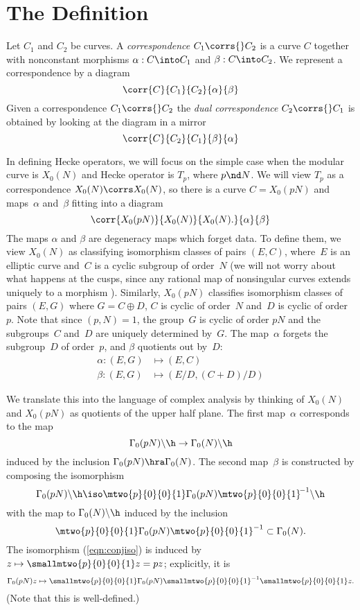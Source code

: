 \documentclass{report}
\begin{document}
\section{The Definition}\label{sec:defn_hecke_corr}

\begin{definition}[Correspondence]
Let $C_1$ and $C_2$ be curves. A {\em correspondence}
$C_1\corrs{}C_2$ is a curve $C$ together with nonconstant morphisms
$\alpha:C\into C_1$ and $\beta:C\into C_2$.  We represent a
correspondence by a diagram
\[
  \corr{C}{C_1}{C_2}{\alpha}{\beta}
\]
Given a correspondence $C_1\corrs{}C_2$ the {\em dual
correspondence} $C_2\corrs{}C_1$ is obtained by looking at the
diagram in a mirror
\[
  \corr{C}{C_2}{C_1}{\beta}{\alpha}
\]
\end{definition}

In defining Hecke operators, we will focus on the simple case when
the modular curve is $X_0(N)$ and Hecke operator is $T_p$, where
$p\nd N$.  We will view $T_p$ as a correspondence $X_0(N)\corrs
X_0(N)$, so there is a curve $C=X_0(pN)$ and maps~$\alpha$
and~$\beta$ fitting into a diagram
\[
  \corr{X_0(pN)}{X_0(N)}{X_0(N).}{\alpha}{\beta}
\]
The maps $\alpha$ and $\beta$ are degeneracy maps which forget
data. To define them, we view $X_0(N)$ as classifying isomorphism
classes of pairs $(E,C)$, where~$E$ is an elliptic curve and~$C$
is a cyclic subgroup of order~$N$ (we will not worry about what
happens at the cusps, since any rational map of nonsingular curves
extends uniquely to a morphism \cite[Ch.~I, Prop.~6.8]{hartshorne}). Similarly, $X_0(pN)$ classifies
isomorphism classes of pairs $(E,G)$ where $G=C\oplus{}D$, $C$ is
cyclic of order~$N$ and~$D$ is cyclic of order~$p$. Note that
since $(p,N)=1$, the group~$G$ is cyclic of order $pN$ and the
subgroups~$C$ and~$D$ are uniquely determined by~$G$. The
map~$\alpha$ forgets the subgroup~$D$ of order~$p$, and $\beta$
quotients out by~$D$:
\begin{align}\label{eqn:alphabeta}
  \alpha:(E,G)&\mapsto(E,C)\\
  \beta:(E,G)&\mapsto(E/D,(C+D)/D)
\end{align}

We translate this into the language of complex analysis by
thinking of $X_0(N)$ and $X_0(pN)$ as quotients of the upper half
plane. The first map~$\alpha$ corresponds to the map
\[
   \Gamma_0(pN)\backslash\h \to \Gamma_0(N)\backslash\h
\]
induced by the inclusion $\Gamma_0(pN) \hra \Gamma_0(N)$. The
second map~$\beta$ is constructed by composing the isomorphism
\begin{equation}\label{eqn:conjiso}
  \Gamma_0(pN)\backslash\h\iso
  \mtwo{p}{0}{0}{1}
   \Gamma_0(pN)
   \mtwo{p}{0}{0}{1}^{\!-1}
  \backslash\h
\end{equation}
with the map to $\Gamma_0(N)\backslash\h$ induced
by the inclusion
\[
 \mtwo{p}{0}{0}{1}
   \Gamma_0(pN)
  \mtwo{p}{0}{0}{1}^{-1} \subset \Gamma_0(N).
\]
The isomorphism (\ref{eqn:conjiso}) is induced by $z\mapsto
\smallmtwo{p}{0}{0}{1}z = pz$; explicitly, it is
\[
\Gamma_0(pN)z\mapsto \smallmtwo{p}{0}{0}{1}\Gamma_0(pN)
\smallmtwo{p}{0}{0}{1}^{-1}\smallmtwo{p}{0}{0}{1}z.
\]
(Note that this is well-defined.)
\end{document}
